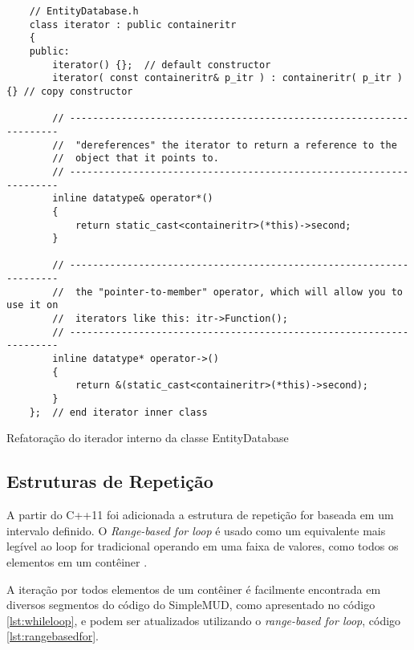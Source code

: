\begin{listing}[!ht]
    \begin{verbatim}
    // EntityDatabase.h
    class iterator : public containeritr
    {
    public:
        iterator() {};  // default constructor
        iterator( const containeritr& p_itr ) : containeritr( p_itr ){} // copy constructor

        // --------------------------------------------------------------------
        //  "dereferences" the iterator to return a reference to the
        //  object that it points to.
        // --------------------------------------------------------------------
        inline datatype& operator*() 
        {
            return static_cast<containeritr>(*this)->second;
        }

        // --------------------------------------------------------------------
        //  the "pointer-to-member" operator, which will allow you to use it on
        //  iterators like this: itr->Function();
        // --------------------------------------------------------------------
        inline datatype* operator->()
        {
            return &(static_cast<containeritr>(*this)->second);
        }
    };  // end iterator inner class
    \end{verbatim}
\caption{Refatoração do iterador interno da classe EntityDatabase}
\label{lst:innerIteratorEntityDatabaseRefc}
\end{listing}

\subsection{Estruturas de Repetição}

A partir do C++11 foi adicionada a estrutura de repetição for baseada em um intervalo definido. 
O \textit{Range-based for loop} é usado como um equivalente mais legível ao loop for tradicional 
operando em uma faixa de valores, como todos os elementos em um contêiner \cite{rangebasedfor}. 

A iteração por todos elementos de um contêiner é facilmente encontrada em diversos segmentos do 
código do SimpleMUD, como apresentado no código \ref{lst:whileloop}, e podem ser atualizados utilizando
o \textit{range-based for loop}, código \ref{lst:rangebasedfor}.

